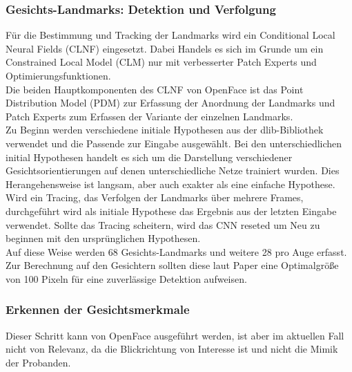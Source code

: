\subsubsection{Gesichts-Landmarks: Detektion und Verfolgung}
Für die Bestimmung und Tracking der Landmarks wird ein Conditional Local Neural Fields (CLNF) eingesetzt. Dabei Handels es sich im Grunde um ein Constrained Local Model (CLM) nur mit verbesserter Patch Experts und Optimierungsfunktionen.\\
Die beiden Hauptkomponenten des CLNF von OpenFace ist das Point Distribution Model (PDM) zur Erfassung der Anordnung der Landmarks und Patch Experts zum Erfassen der Variante der einzelnen Landmarks.\\
Zu Beginn werden verschiedene initiale Hypothesen aus der dlib-Bibliothek verwendet und die Passende zur Eingabe ausgewählt. Bei den unterschiedlichen initial Hypothesen handelt es sich um die Darstellung verschiedener Gesichtsorientierungen auf denen unterschiedliche Netze trainiert wurden. Dies Herangehensweise ist langsam, aber auch exakter als eine einfache Hypothese. Wird ein Tracing, das Verfolgen der Landmarks über mehrere Frames, durchgeführt wird als initiale Hypothese das Ergebnis aus der letzten Eingabe verwendet. Sollte das Tracing scheitern, wird das CNN reseted um Neu zu beginnen mit den ursprünglichen Hypothesen.\\
Auf diese Weise werden 68 Gesichts-Landmarks und  weitere 28 pro Auge erfasst. Zur Berechnung auf den Gesichtern sollten diese laut Paper \cite{OpenFace} eine Optimalgröße von 100 Pixeln für eine zuverlässige Detektion aufweisen.
\subsubsection{Erkennen der Gesichtsmerkmale}
Dieser Schritt kann von OpenFace ausgeführt werden, ist aber im aktuellen Fall nicht von Relevanz, da die Blickrichtung von Interesse ist und nicht die Mimik der Probanden.
